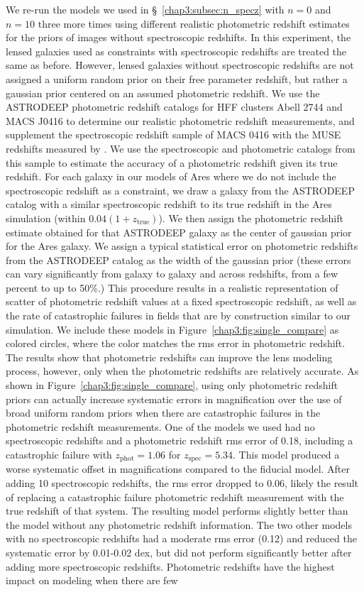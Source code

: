 We re-run the models we used in \S~\ref{chap3:subsec:n_specz} with $n=0$ and $n=10$ three more times using different realistic photometric redshift estimates for the priors of images without spectroscopic redshifts. In this experiment, the lensed galaxies used as constraints with spectroscopic redshifts are treated the same as before. However, lensed galaxies without spectroscopic redshifts are not assigned a uniform random prior on their free parameter redshift, but rather a gaussian prior centered on an assumed photometric redshift. We use the ASTRODEEP photometric redshift catalogs for HFF clusters Abell 2744 and MACS J0416 \citep{Castellano:2016lr} to determine our realistic photometric redshift measurements, and supplement the spectroscopic redshift sample of MACS 0416 with the MUSE redshifts measured by \citet{Caminha:2017rw}. We use the spectroscopic and photometric catalogs from this sample to estimate the accuracy of a photometric redshift given its true redshift. For each galaxy in our models of Ares where we do not include the spectroscopic redshift as a constraint, we draw a galaxy from the ASTRODEEP catalog with a similar spectroscopic redshift to its true redshift in the Ares simulation (within $0.04(1+z_\mathrm{true})$). We then assign the photometric redshift estimate obtained for that ASTRODEEP galaxy as the center of gaussian prior for the Ares galaxy. We assign a typical statistical error on photometric redshifts from the ASTRODEEP catalog as the width of the gaussian prior (these errors can vary significantly from galaxy to galaxy and across redshifts, from a few percent to up to 50\%.) This procedure results in a realistic representation of scatter of photometric redshift values at a fixed spectroscopic redshift, as well as the rate of catastrophic failures in fields that are by construction similar to our simulation. We include these models in Figure~\ref{chap3:fig:single_compare} as colored circles, where the color matches the rms error in photometric redshift. The results show that photometric redshifts can improve the lens modeling process, however, only when the photometric redshifts are relatively accurate. As shown in Figure~\ref{chap3:fig:single_compare}, using only photometric redshift priors can actually increase systematic errors in magnification over the use of broad uniform random priors when there are catastrophic failures in the photometric redshift measurements. One of the models we used had no spectroscopic redshifts and a photometric redshift rms error of 0.18, including a catastrophic failure with $z_\mathrm{phot} = 1.06$ for $z_\mathrm{spec} = 5.34$. This model produced a worse systematic offset in magnifications compared to the fiducial model. After adding 10 spectroscopic redshifts, the rms error dropped to 0.06, likely the result of replacing a catastrophic failure photometric redshift measurement with the true redshift of that system. The resulting model performs slightly better than the model without any photometric redshift information. The two other models with no spectroscopic redshifts had a moderate rms error (0.12) and reduced the systematic error by 0.01-0.02 dex, but did not perform significantly better after adding more spectroscopic redshifts. Photometric redshifts have the highest impact on modeling when there are few 